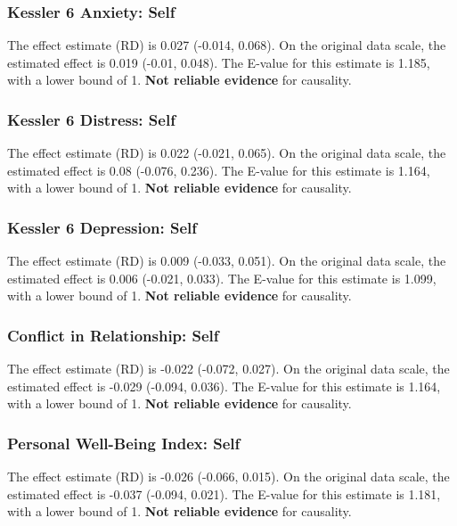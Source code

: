 \documentclass[
  singlecolumn]{article}
\begin{document}
\subsubsection{Kessler 6 Anxiety: Self}\label{kessler-6-anxiety-self-7}

The effect estimate (RD) is 0.027 (-0.014, 0.068). On the original data
scale, the estimated effect is 0.019 (-0.01, 0.048). The E-value for
this estimate is 1.185, with a lower bound of 1. \textbf{Not reliable
evidence} for causality.

\subsubsection{Kessler 6 Distress:
Self}\label{kessler-6-distress-self-7}

The effect estimate (RD) is 0.022 (-0.021, 0.065). On the original data
scale, the estimated effect is 0.08 (-0.076, 0.236). The E-value for
this estimate is 1.164, with a lower bound of 1. \textbf{Not reliable
evidence} for causality.

\subsubsection{Kessler 6 Depression:
Self}\label{kessler-6-depression-self-7}

The effect estimate (RD) is 0.009 (-0.033, 0.051). On the original data
scale, the estimated effect is 0.006 (-0.021, 0.033). The E-value for
this estimate is 1.099, with a lower bound of 1. \textbf{Not reliable
evidence} for causality.

\subsubsection{Conflict in Relationship:
Self}\label{conflict-in-relationship-self-7}

The effect estimate (RD) is -0.022 (-0.072, 0.027). On the original data
scale, the estimated effect is -0.029 (-0.094, 0.036). The E-value for
this estimate is 1.164, with a lower bound of 1. \textbf{Not reliable
evidence} for causality.

\subsubsection{Personal Well-Being Index:
Self}\label{personal-well-being-index-self-7}

The effect estimate (RD) is -0.026 (-0.066, 0.015). On the original data
scale, the estimated effect is -0.037 (-0.094, 0.021). The E-value for
this estimate is 1.181, with a lower bound of 1. \textbf{Not reliable
evidence} for causality.
\end{document}
